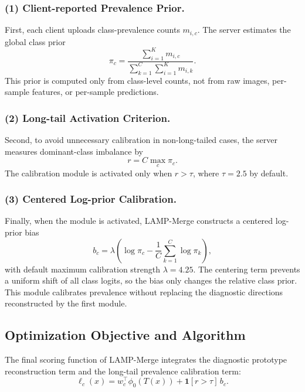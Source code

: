 \documentclass[letterpaper]{article} %
\begin{document}
\subsubsection{(1) Client-reported Prevalence Prior.}

First, each client uploads class-prevalence counts $m_{i,c}$. The server estimates the global class prior
\begin{equation}
\pi_c=\frac{\sum_{i=1}^{K}m_{i,c}}{\sum_{k=1}^{C}\sum_{i=1}^{K}m_{i,k}}.
\end{equation}
This prior is computed only from class-level counts, not from raw images, per-sample features, or per-sample predictions.

\subsubsection{(2) Long-tail Activation Criterion.}

Second, to avoid unnecessary calibration in non-long-tailed cases, the server measures dominant-class imbalance by
\begin{equation}
r=C\max_c \pi_c.
\end{equation}
The calibration module is activated only when $r>\tau$, where $\tau=2.5$ by default.

\subsubsection{(3) Centered Log-prior Calibration.}

Finally, when the module is activated, LAMP-Merge constructs a centered log-prior bias
\begin{equation}
b_c=\lambda\left(\log\pi_c-\frac{1}{C}\sum_{k=1}^{C}\log\pi_k\right),
\end{equation}
with default maximum calibration strength $\lambda=4.25$. The centering term prevents a uniform shift of all class logits, so the bias only changes the relative class prior. This module calibrates prevalence without replacing the diagnostic directions reconstructed by the first module.

\subsection{Optimization Objective and Algorithm}

The final scoring function of LAMP-Merge integrates the diagnostic prototype reconstruction term and the long-tail prevalence calibration term:
\begin{equation}
\ell_c(x)=w_c^\top\phi_0(T(x))+\mathbf{1}[r>\tau]\,b_c.
\end{equation}
\end{document}

